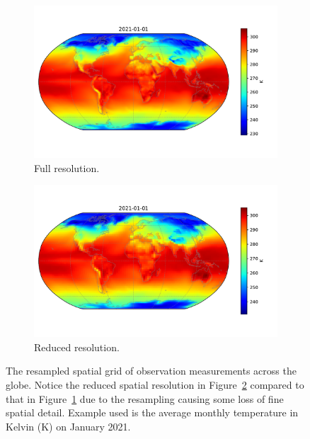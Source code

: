  \begin{figure}[htbp!] 
 	\centering    
	\begin{subfigure}[b]{0.45\textwidth}
		\includegraphics[width=\textwidth]{full_grid}
		\caption{Full resolution.}
		\label{fig:full_res}   
	\end{subfigure}             
	\begin{subfigure}[b]{0.45\textwidth}
		\includegraphics[width=\textwidth]{coarse_grid}
		\caption{Reduced resolution.}
		\label{fig:coarse_res}
	\end{subfigure}             
 	\caption[The CESM-LE dataset spatial grid after preprocessing using resampling.]{The resampled spatial grid of observation measurements across the globe. Notice the reduced spatial resolution in Figure~\ref{fig:coarse_res} compared to that in Figure~\ref{fig:full_res} due to the resampling causing some loss of fine spatial detail. Example used is the average monthly temperature in Kelvin ($\si{\kelvin}$) on January 2021.}
 	\label{fig:cesm_grid}
 \end{figure}

